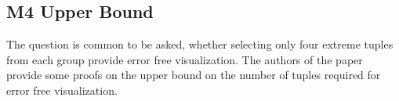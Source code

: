 \subsection{M4 Upper Bound}
The question is common to be asked, whether selecting only four extreme tuples from each group provide error free visualization. The authors of the paper provide some proofs on the upper bound on the number of tuples required for error free visualization. 
